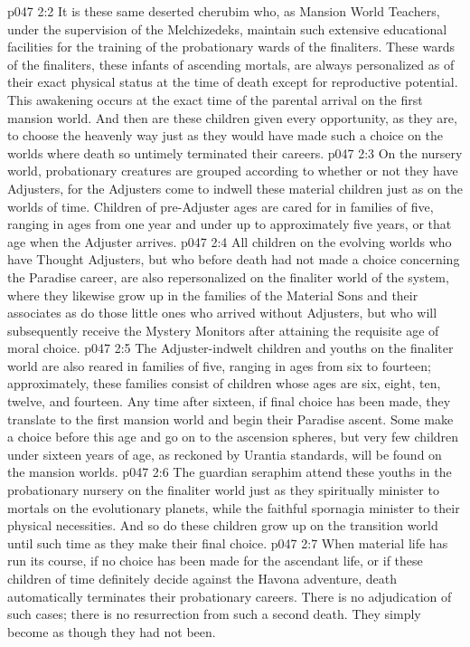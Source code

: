 \vs p047 2:2 It is these same deserted cherubim who, as Mansion World Teachers, under the supervision of the Melchizedeks, maintain such extensive educational facilities for the training of the probationary wards of the finaliters. These wards of the finaliters, these infants of ascending mortals, are always personalized as of their exact physical status at the time of death except for reproductive potential. This awakening occurs at the exact time of the parental arrival on the first mansion world. And then are these children given every opportunity, as they are, to choose the heavenly way just as they would have made such a choice on the worlds where death so untimely terminated their careers.
\vs p047 2:3 On the nursery world, probationary creatures are grouped according to whether or not they have Adjusters, for the Adjusters come to indwell these material children just as on the worlds of time. Children of pre\hyp{}Adjuster ages are cared for in families of five, ranging in ages from one year and under up to approximately five years, or that age when the Adjuster arrives.
\vs p047 2:4 All children on the evolving worlds who have Thought Adjusters, but who before death had not made a choice concerning the Paradise career, are also repersonalized on the finaliter world of the system, where they likewise grow up in the families of the Material Sons and their associates as do those little ones who arrived without Adjusters, but who will subsequently receive the Mystery Monitors after attaining the requisite age of moral choice.
\vs p047 2:5 The Adjuster\hyp{}indwelt children and youths on the finaliter world are also reared in families of five, ranging in ages from six to fourteen; approximately, these families consist of children whose ages are six, eight, ten, twelve, and fourteen. Any time after sixteen, if final choice has been made, they translate to the first mansion world and begin their Paradise ascent. Some make a choice before this age and go on to the ascension spheres, but very few children under sixteen years of age, as reckoned by Urantia standards, will be found on the mansion worlds.
\vs p047 2:6 The guardian seraphim attend these youths in the probationary nursery on the finaliter world just as they spiritually minister to mortals on the evolutionary planets, while the faithful spornagia minister to their physical necessities. And so do these children grow up on the transition world until such time as they make their final choice.
\vs p047 2:7 When material life has run its course, if no choice has been made for the ascendant life, or if these children of time definitely decide against the Havona adventure, death automatically terminates their probationary careers. There is no adjudication of such cases; there is no resurrection from such a second death. They simply become as though they had not been.
